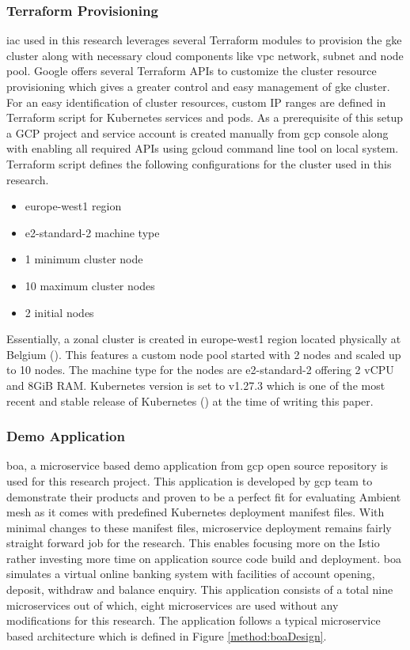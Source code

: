 \subsubsection{Terraform Provisioning}
\acrfull{iac} used in this research leverages several Terraform modules to provision the \acrshort{gke} cluster along with necessary cloud components like \acrshort{vpc} network, subnet and node pool. Google offers several Terraform APIs to customize the cluster resource provisioning which gives a greater control and easy management of \acrshort{gke} cluster. For an easy identification of cluster resources, custom IP ranges are defined in Terraform script for Kubernetes services and pods. As a prerequisite of this setup a GCP project and service account is created manually from \acrshort{gcp} console along with enabling all required APIs using gcloud command line tool on local system. Terraform script defines the following configurations for the cluster used in this research. 
\begin{itemize}
    \item europe-west1 region 
    \item e2-standard-2 machine type
    \item 1 minimum cluster node
    \item 10 maximum cluster nodes
    \item 2 initial nodes
\end{itemize}

Essentially, a zonal cluster is created in europe-west1 region located physically at Belgium (\cite{gcpDocRegion}). This features a custom node pool started with 2 nodes and scaled up to 10 nodes. The machine type for the nodes are e2-standard-2 offering 2 vCPU and 8GiB RAM. Kubernetes version is set to v1.27.3 which is one of the most recent and stable release of Kubernetes (\cite{kubeDocRelease}) at the time of writing this paper.


\subsubsection{Demo Application}
\acrshort{boa}, a microservice based demo application from \acrshort{gcp} open source repository \cite{githubBOA} is used for this research project. This application is developed by \acrshort{gcp} team to demonstrate their products and proven to be a perfect fit for evaluating Ambient mesh as it comes with predefined Kubernetes deployment manifest files. With minimal changes to these manifest files, microservice deployment remains fairly straight forward job for the research. This enables focusing more on the Istio rather investing more time on application source code build and deployment. \acrshort{boa} simulates a virtual online banking system with facilities of account opening, deposit, withdraw and balance enquiry. This application consists of a total nine microservices out of which, eight microservices are used without any modifications for this research. The application follows a typical microservice based architecture which is defined in Figure \ref{method:boaDesign}.


